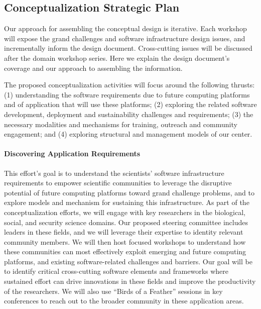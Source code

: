 \subsection{Conceptualization Strategic Plan}
Our approach for assembling the conceptual design is iterative. Each workshop will expose the
grand challenges and software infrastructure design issues, and incrementally inform the design
document. Cross-cutting issues will be discussed after the domain workshop series. Here we explain
the design document’s coverage and our approach to assembling the information.

The proposed conceptualization activities will focus around the following thrusts: (1) understanding
the software requirements due to future computing platforms and of application that will
use these platforms; (2) exploring the related software development, deployment and sustainability
challenges and requirements; (3) the necessary modalities and mechanisms for training, outreach
and community engagement; and (4) exploring structural and management models of our center.

\paragraph{Discovering Application Requirements} This effort’s goal is to understand the scientists’ software
infrastructure requirements to empower scientific communities to leverage the disruptive
potential of future computing platforms toward grand challenge problems, and to explore models
and mechanism for sustaining this infrastructure. As part of the conceptualization efforts, we will
engage with key researchers in the biological, social, and security science domains. Our proposed
steering committee includes leaders in these fields, and we will leverage their expertise to identity
relevant community members. We will then host focused workshops to understand how these
communities can most effectively exploit emerging and future computing platforms, and existing
software-related challenges and barriers. Our goal will be to identify critical cross-cutting software
elements and frameworks where sustained effort can drive innovations in these fields and improve
the productivity of the researchers. We will also use “Birds of a Feather” sessions in key conferences
to reach out to the broader community in these application areas.

